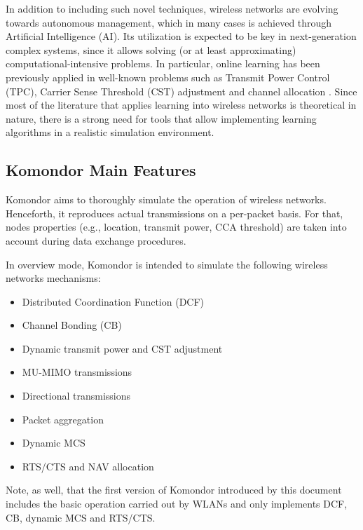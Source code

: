 \documentclass[a4paper]{article}
\begin{document}
	In addition to including such novel techniques, wireless networks are evolving towards autonomous management, which in many cases is achieved through Artificial Intelligence (AI). Its utilization is expected to be key in next-generation complex systems, since it allows solving (or at least approximating) computational-intensive problems. In particular, online learning has been previously applied in well-known problems such as Transmit Power Control (TPC), Carrier Sense Threshold (CST) adjustment and channel allocation \cite{wilhelmi2017implications, wilhelmi2017collaborative, maghsudi2015joint, maghsudi2015channel}. Since most of the literature that applies learning into wireless networks is theoretical in nature, there is a strong need for tools that allow implementing learning algorithms in a realistic simulation environment.	
	
	\subsection{Komondor Main Features}
	\label{section:features}
	Komondor aims to thoroughly simulate the operation of wireless networks. Henceforth, it reproduces actual transmissions on a per-packet basis. For that, nodes properties (e.g., location, transmit power, CCA threshold) are taken into account during data exchange procedures.
	
	In overview mode, Komondor is intended to simulate the following wireless networks mechanisms:
	\begin{itemize}
		\item Distributed Coordination Function (DCF)
		\item Channel Bonding (CB)
		\item Dynamic transmit power and CST adjustment
		\item MU-MIMO transmissions
		\item Directional transmissions
		\item Packet aggregation
		\item Dynamic MCS
		\item RTS/CTS and NAV allocation
	\end{itemize}

	Note, as well, that the first version of Komondor introduced by this document includes the basic operation carried out by WLANs and only implements DCF, CB, dynamic MCS and RTS/CTS.
	
\end{document}
